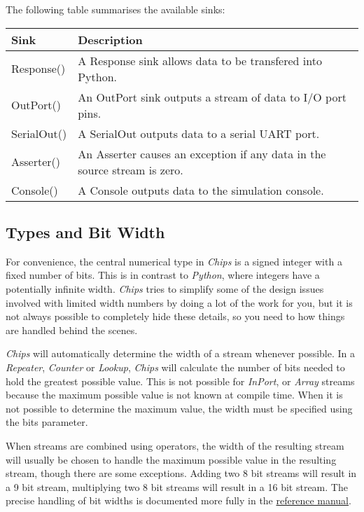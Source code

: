 \documentclass[letterpaper,10pt,english]{sphinxmanual}
\begin{document}
The following table summarises the available sinks:

\begin{tabulary}{\linewidth}{|L|L|}
\hline
\textbf{
Sink
} & \textbf{
Description
}\\
\hline

Response()
 & 
A Response sink allows data to be transfered into
Python.
\\

OutPort()
 & 
An OutPort sink outputs a stream of data to I/O port
pins.
\\

SerialOut()
 & 
A SerialOut outputs data to a serial UART port.
\\

Asserter()
 & 
An Asserter causes an exception if any data in the
source stream is zero.
\\

Console()
 & 
A Console outputs data to the simulation console.
\\
\hline
\end{tabulary}

\begin{quote}
\end{quote}


\subsection{Types and Bit Width}
\label{tutorial/index:types-and-bit-width}
For convenience, the central numerical type in \emph{Chips} is a signed integer with
a fixed number of bits.  This is in contrast to \emph{Python}, where integers have a
potentially infinite width. \emph{Chips} tries to simplify some of the design issues
involved with limited width numbers by doing a lot of the work for you, but it
is not always possible to completely hide these details, so you need to how
things are handled behind the scenes.

\emph{Chips} will automatically determine the width of a stream whenever possible.
In a \emph{Repeater}, \emph{Counter} or \emph{Lookup}, \emph{Chips} will calculate the number of
bits needed to hold the greatest possible value. This is not possible for
\emph{InPort}, or \emph{Array} streams because the maximum possible value is not known at
compile time. When it is not possible to determine the maximum value, the width
must be specified using the bits parameter.

When streams are combined using operators, the width of the resulting stream
will usually be chosen to handle the maximum possible value in the resulting
stream, though there are some exceptions. Adding two 8 bit streams will result
in a 9 bit stream, multiplying two 8 bit streams will result in a 16 bit
stream. The precise handling of bit widths is documented more  fully in the
\href{http://dawsonjon.github.com/chips/language\_reference/}{reference manual}.
\end{document}

